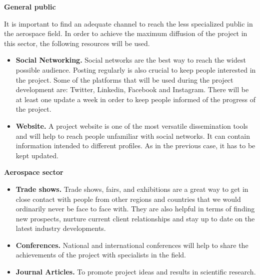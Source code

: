 \textbf{General public}

It is important to find an adequate channel to reach the less specialized public in the aerospace field. In order to achieve the maximum diffusion of the project in this sector,  the following resources will be used.

\begin{itemize}
	\item{ 
		\textbf{Social Networking.} Social networks are the best way to reach the widest possible audience. Posting regularly is also crucial to keep people interested in the project. Some of the platforms that will be used during the project development are: Twitter, Linkedin, Facebook and Instagram. There will be at least one update a week in order to keep people informed of the progress of the project.
	}
	\item {
		\textbf{Website.} A project website is one of the most versatile dissemination tools and will help to reach people unfamiliar with social networks. It can contain information intended to different profiles. As in the previous case, it has to be kept updated.
	}
\end{itemize}

\textbf{Aerospace sector}


\begin{itemize}
	
	\item{
		\textbf{Trade shows.} Trade shows, fairs, and exhibitions are a great way to get in close contact with people from other regions and countries that we would ordinarily never be face to face with. They are also helpful in terms of finding new prospects, nurture current client relationships and stay up to date on the latest industry developments. 
	}
	\item {
		\textbf{Conferences.} National and international conferences will help to share the achievements of the project with specialists in the field.
	}
	\item {
		\textbf{Journal Articles.} To promote project ideas and results in scientific research.
	}
\end{itemize}



